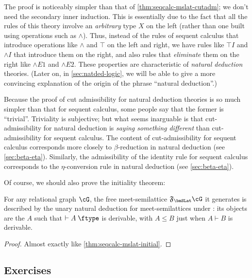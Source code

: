 \documentclass{book}
\let\types\vdash
\def\type{\;\ftype}
\newcommand{\F}[1]{\mathfrak{F}_{#1}}
\let\meet\wedge
\def\meetE{\mathord{\meet}E}
\def\meetI{\mathord{\meet}I}
\begin{document}
The proof is noticeably simpler than that of \cref{thm:seqcalc-mslat-cutadm}; we don't need the secondary inner induction.
This is essentially due to the fact that all the rules of this theory involve an \emph{arbitrary} type $X$ on the left (rather than one built using operations such as $\meet$).
Thus, instead of the rules of sequent calculus that introduce operations like $\meet$ and $\top$ on the left and right, we have rules like $\top I$ and $\meetI$ that introduce them on the right, and also rules that \emph{eliminate} them on the right like $\meetE1$ and $\meetE2$.
These properties are characteristic of \emph{natural deduction} theories.
(Later on, in \cref{sec:natded-logic}, we will be able to give a more convincing explanation of the origin of the phrase ``natural deduction''.)

\begin{rmk}
  Because the proof of cut admissibility for natural deduction theories is so much simpler than that for sequent calculus, some people say that the former is ``trivial''.
  Triviality is subjective; but what seems inarguable is that cut-admissibility for natural deduction is \emph{saying something different} than cut-admissibility for sequent calculus.
  The content of cut-admissibility for sequent calculus corresponds more closely to $\beta$-reduction in natural deduction (see \cref{sec:beta-eta}).
  Similarly, the admissibility of the identity rule for sequent calculus corresponds to the $\eta$-conversion rule in natural deduction (see \cref{sec:beta-eta}).
\end{rmk}

Of course, we should also prove the initiality theorem:

\begin{thm}\label{thm:natded-mslat-initial}
  For any relational graph $\cG$, the free meet-semilattice $\F\bmSLat \cG$ it generates is described by the unary natural deduction for meet-semilattices under \cG: its objects are the $A$ such that $\types A\type$ is derivable, with $A\le B$ just when $A\types B$ is derivable.
\end{thm}
\begin{proof}
  Almost exactly like \cref{thm:seqcalc-mslat-initial}.
\end{proof}

\subsection*{Exercises}
\end{document}
